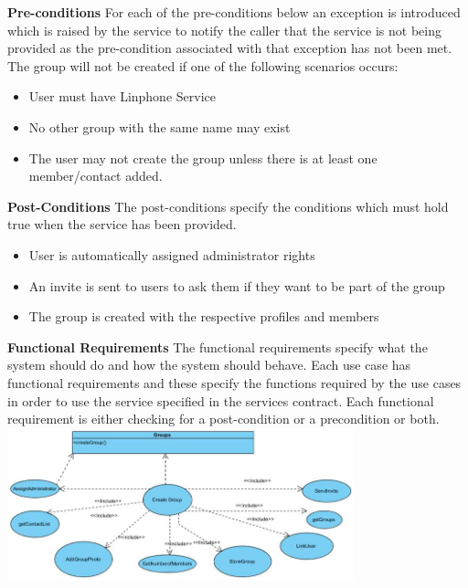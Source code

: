 \documentclass[11pt]{article}
\begin{document}
\textbf{Pre-conditions} \newline
For each of the pre-conditions below an exception is introduced which is raised by the service to notify the caller that the service is not being provided as the pre-condition associated with that exception has not been met.\newline
The group will not be created if one of the following scenarios occurs:\newline
\newline
\begin{itemize}
\item	User must have Linphone Service\newline
\item	No other group with the same name may exist \newline
\item	The user may not create the group unless there is at least one member/contact added.\newline
\end{itemize}
\textbf{Post-Conditions}\newline
The post-conditions specify the conditions which must hold true when the service has been provided.\newline
\newline
\begin{itemize}
\item	User is automatically assigned administrator rights
\item	An invite is sent to users to ask them if they want to be part of the group
\item	The group is created with the respective profiles and members
\end{itemize}
\textbf{Functional Requirements}\newline
 The functional requirements specify what the system should do and how the system should behave. Each use case has functional requirements and these specify the functions required by the use cases in order to use the service specified in the services contract. Each functional requirement is either checking for a post-condition or a precondition or both.\newline
 \newline
\includegraphics[width=380px]{./images/FR-create.jpg}
\end{document}

